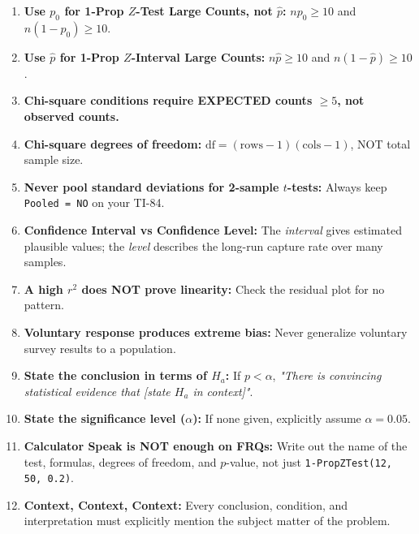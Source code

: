 \begin{enumerate}[label=\textbf{\arabic*.}]
    \item \textbf{Use $p_0$ for 1-Prop $Z$-Test Large Counts, not $\hat{p}$:} $np_0 \ge 10$ and $n(1-p_0) \ge 10$.
    \item \textbf{Use $\hat{p}$ for 1-Prop $Z$-Interval Large Counts:} $n\hat{p} \ge 10$ and $n(1-\hat{p}) \ge 10$.
    \item \textbf{Chi-square conditions require EXPECTED counts $\ge 5$, not observed counts.}
    \item \textbf{Chi-square degrees of freedom:} $\text{df} = (\text{rows}-1)(\text{cols}-1)$, NOT total sample size.
    \item \textbf{Never pool standard deviations for 2-sample $t$-tests:} Always keep \texttt{Pooled = NO} on your TI-84.
    \item \textbf{Confidence Interval vs Confidence Level:} The \emph{interval} gives estimated plausible values; the \emph{level} describes the long-run capture rate over many samples.
    \item \textbf{A high $r^2$ does NOT prove linearity:} Check the residual plot for no pattern.
    \item \textbf{Voluntary response produces extreme bias:} Never generalize voluntary survey results to a population.
    \item \textbf{State the conclusion in terms of $H_a$:} If $p < \alpha$, \emph{"There is convincing statistical evidence that [state $H_a$ in context]"}.
    \item \textbf{State the significance level ($\alpha$):} If none given, explicitly assume $\alpha = 0.05$.
    \item \textbf{Calculator Speak is NOT enough on FRQs:} Write out the name of the test, formulas, degrees of freedom, and $p$-value, not just \texttt{1-PropZTest(12, 50, 0.2)}.
    \item \textbf{Context, Context, Context:} Every conclusion, condition, and interpretation must explicitly mention the subject matter of the problem.
\end{enumerate}
